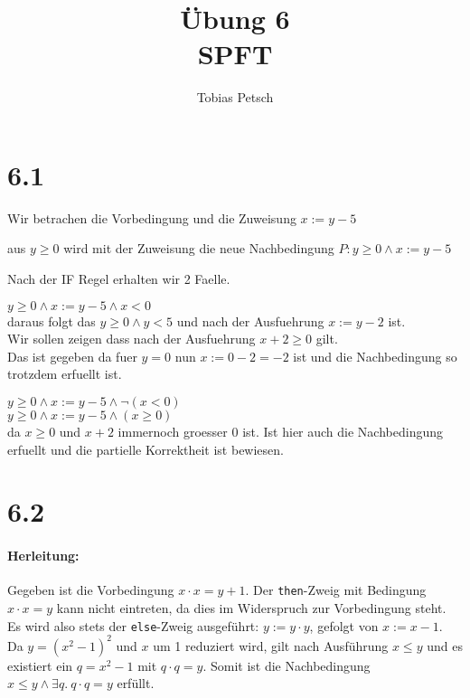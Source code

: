 \documentclass[a4paper,12pt]{article}
\title{Übung 6\\
\large SPFT}
\author{Tobias Petsch}
\date{}
\begin{document}
\maketitle

\section*{6.1}

Wir betrachen die Vorbedingung und die Zuweisung $x := y - 5$

aus $y \geq 0$ wird mit der Zuweisung die neue Nachbedingung $P: y \geq 0 \land x := y - 5$ 

Nach der IF Regel erhalten wir 2 Faelle. \\


$y \geq 0 \land x := y - 5 \land x < 0$ \\

daraus folgt das $y \geq 0 \land y < 5$ und nach der Ausfuehrung $x := y - 2$ ist. \\

Wir sollen zeigen dass nach der Ausfuehrung $x+2 \geq 0$ gilt. \\

Das ist gegeben da fuer $y=0$ nun $x := 0 - 2 = -2$ ist und die Nachbedingung so trotzdem erfuellt ist. \\


$y \geq 0 \land x := y - 5 \land \neg (x < 0)$ \\

$y \geq 0 \land x := y - 5 \land (x \geq 0)$ \\

da $x \geq 0$ und $x + 2$ immernoch groesser 0 ist. Ist hier auch die Nachbedingung erfuellt und die partielle Korrektheit ist bewiesen.



\section*{6.2}

\paragraph{Herleitung:} 
Gegeben ist die Vorbedingung $x \cdot x = y + 1$. 
Der \texttt{then}-Zweig mit Bedingung $x \cdot x = y$ kann nicht eintreten, da dies im Widerspruch zur Vorbedingung steht. 
Es wird also stets der \texttt{else}-Zweig ausgeführt: $y := y \cdot y$, gefolgt von $x := x - 1$. Da $y = (x^2 - 1)^2$ und $x$ um 1 reduziert wird, 
gilt nach Ausführung $x \leq y$ und es existiert ein $q = x^2 - 1$ mit $q \cdot q = y$. Somit ist die Nachbedingung $x \leq y \land \exists q.\ q \cdot q = y$ erfüllt.
\end{document}
